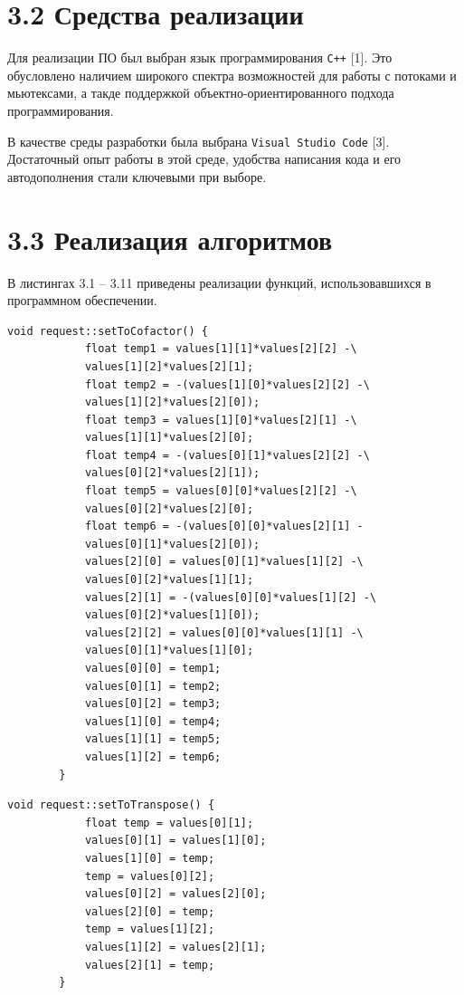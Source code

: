 \documentclass[12pt, a4paper]{report}
\begin{document}
	\section*{3.2 Средства реализации}
	
	Для реализации ПО был выбран язык программирования \verb|С++| [1]. Это обусловлено наличием широкого спектра возможностей для работы с потоками и мьютексами, а такде поддержкой объектно-ориентированного подхода программирования.
	
	В качестве среды разработки была выбрана \verb|Visual Studio Code| [3]. Достаточный опыт работы в этой среде, удобства написания кода и его автодополнения стали ключевыми при выборе.
	
	\section*{3.3 Реализация алгоритмов}
	
	В листингах 3.1 -- 3.11 приведены реализации функций, использовавшихся в программном обеспечении.
	
	\newpage
	\begin{lstlisting}[title=Листинг 3.1~--- Функция преобразования матрицы к матрице алгебраических дополнений]
		void request::setToCofactor() {
			float temp1 = values[1][1]*values[2][2] -\
			values[1][2]*values[2][1];
			float temp2 = -(values[1][0]*values[2][2] -\
			values[1][2]*values[2][0]);
			float temp3 = values[1][0]*values[2][1] -\
			values[1][1]*values[2][0];
			float temp4 = -(values[0][1]*values[2][2] -\
			values[0][2]*values[2][1]);
			float temp5 = values[0][0]*values[2][2] -\
			values[0][2]*values[2][0];
			float temp6 = -(values[0][0]*values[2][1] -
			values[0][1]*values[2][0]);
			values[2][0] = values[0][1]*values[1][2] -\
			values[0][2]*values[1][1];
			values[2][1] = -(values[0][0]*values[1][2] -\
			values[0][2]*values[1][0]);
			values[2][2] = values[0][0]*values[1][1] -\
			values[0][1]*values[1][0];
			values[0][0] = temp1;
			values[0][1] = temp2;
			values[0][2] = temp3;
			values[1][0] = temp4;
			values[1][1] = temp5;
			values[1][2] = temp6;
		}
	\end{lstlisting}
	
	\begin{lstlisting}[title=Листинг 3.2~--- Функция транспонирования матрицы]
		void request::setToTranspose() {
			float temp = values[0][1];
			values[0][1] = values[1][0];
			values[1][0] = temp;
			temp = values[0][2];
			values[0][2] = values[2][0];
			values[2][0] = temp;
			temp = values[1][2];
			values[1][2] = values[2][1];
			values[2][1] = temp;
		}
	\end{lstlisting}
	
\end{document}
